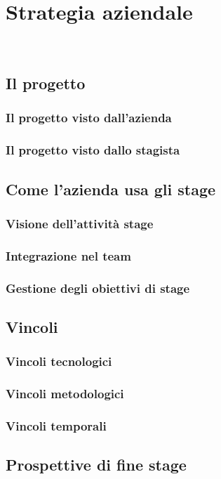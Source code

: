 
\chapter{Strategia aziendale}
\label{cap:strat-aziend}

\\

\section{Il progetto}

\subsection{Il progetto visto dall'azienda}

\subsection{Il progetto visto dallo stagista}

\section{Come l'azienda usa gli stage}

\subsection{Visione dell'attività stage}

\subsection{Integrazione nel team}

\subsection{Gestione degli obiettivi di stage}

\section{Vincoli}

\subsection{Vincoli tecnologici}

\subsection{Vincoli metodologici}

\subsection{Vincoli temporali}

\section{Prospettive di fine stage}
